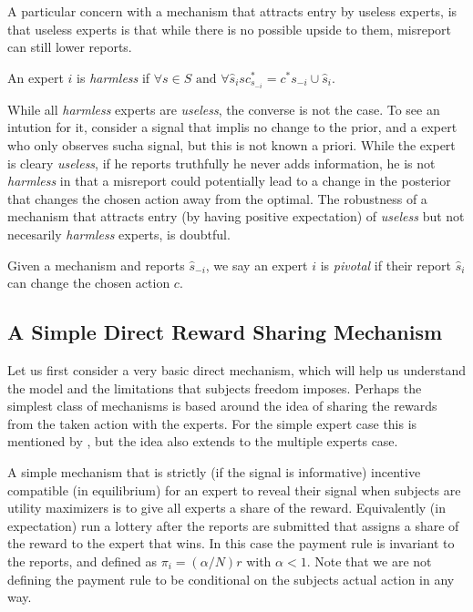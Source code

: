 A particular concern with a mechanism that attracts entry by useless experts, is that useless experts is that while there is no possible upside to them, misreport can still lower reports.

\begin{defn}\label{defn:harmless}
	An expert $i$ is \emph{harmless} if $\forall s \in S \text{ and }\forall \hat{s}_i s c^{*}_{s_{-i}} = c^{*}{s_{-i} \cup \hat{s}_i}$.
\end{defn}

While all \emph{harmless} experts are \emph{useless}, the converse is not the case. To see an intution for it, consider a signal that implis no change to the prior, and a expert who only observes sucha signal, but this is not known a priori. While the expert is cleary \emph{useless}, if he reports truthfully he never adds information, he is not \emph{harmless} in that a misreport could potentially lead to a change in the posterior that changes the chosen action away from the optimal.
The robustness of a mechanism that attracts entry (by having positive expectation) of \emph{useless} but not necesarily \emph{harmless}  experts, is doubtful.

\begin{defn}\label{defn:pivotal}
Given a mechanism and reports $\hat{s}_{-i}$, we say an expert $i$ is \emph{pivotal} if their report $\hat{s}_i$ can change the chosen action $c$.
\end{defn}


\subsection{A Simple Direct Reward Sharing Mechanism}


Let us first consider a very basic direct mechanism, which will help us understand the model and the limitations that subjects freedom imposes. 
Perhaps the simplest class of mechanisms is based around the idea of sharing the rewards from the taken action with the experts. For the simple expert case this is mentioned by \cite{othman2010decision}, but the idea also extends to the multiple experts case. 

A simple mechanism that is strictly (if the signal is informative) incentive compatible (in equilibrium) for an expert to reveal their signal when subjects are utility maximizers is to give all experts a share of the reward. Equivalently (in expectation) run a lottery after the reports are submitted that assigns a share of the reward to the expert that wins. 
In this case the payment rule is invariant to the reports, and defined as $\pi_i  = (\alpha / N ) r $ with $\alpha < 1$. Note that we are not defining the payment rule to be conditional on the subjects actual action in any way. %

